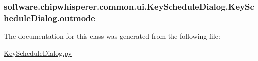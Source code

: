\subsubsection[{outmode}]{\setlength{\rightskip}{0pt plus 5cm}software.\+chipwhisperer.\+common.\+ui.\+Key\+Schedule\+Dialog.\+Key\+Schedule\+Dialog.\+outmode}\label{classsoftware_1_1chipwhisperer_1_1common_1_1ui_1_1KeyScheduleDialog_1_1KeyScheduleDialog_ac9f84960ed192212c88c3ce3beab65e5}


The documentation for this class was generated from the following file\+:\begin{DoxyCompactItemize}
\item 
\hyperlink{KeyScheduleDialog_8py}{Key\+Schedule\+Dialog.\+py}\end{DoxyCompactItemize}
